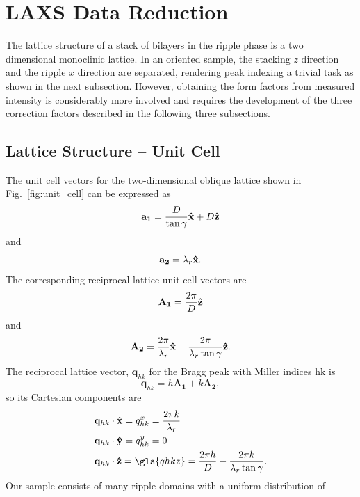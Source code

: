 \newpage
\section{LAXS Data Reduction}\label{sec:LAXS_data_reduction}
The lattice structure of a stack of bilayers in the ripple  phase is a two 
dimensional monoclinic lattice. 
In an oriented sample, the stacking $z$ direction and the ripple
$x$ direction are separated, rendering peak indexing a trivial task as 
shown in the next subsection.
However, obtaining the form factors from measured intensity is considerably
more involved and requires the development of the three correction factors 
described in the following three subsections.

\subsection{Lattice Structure -- Unit Cell}\label{sec:lattice_structure}
The unit cell vectors for the two-dimensional oblique lattice shown in Fig.~\ref{fig:unit_cell}
can be expressed as 
\begin{equation}
  \mathbf{a_1} = \frac{D}{\tan\gamma}\mathbf{\hat{x}} + D\mathbf{\hat{z}}
\end{equation}
and
\begin{equation}
  \mathbf{a_2} = \lambda_r\mathbf{\hat{x}}.
\end{equation}
The corresponding reciprocal lattice unit cell vectors are
\begin{equation}
  \mathbf{A_1} = \frac{2\pi}{D}\mathbf{\hat{z}}
\end{equation}
and
\begin{equation}
  \mathbf{A_2} = \frac{2\pi}{\lambda_r}\mathbf{\hat{x}} - \frac{2\pi}{\lambda_r\tan\gamma}\mathbf{\hat{z}}.
\end{equation}
The reciprocal lattice vector, $\mathbf{q}_{hk}$ for the Bragg peak with 
Miller indices \gls{hk} is 
\begin{equation}
  \mathbf{q}_{hk}=h\mathbf{A_1}+k\mathbf{A_2},
\end{equation}
so its Cartesian components are
\begin{align}
  & \mathbf{q}_{hk}\cdot\xhat = q_{hk}^x = \frac{2\pi k}{\lambda_r}\\
  & \mathbf{q}_{hk}\cdot\yhat = q_{hk}^y = 0 \\
  & \mathbf{q}_{hk}\cdot\zhat = \gls{qhkz} = \frac{2\pi h}{D} - \frac{2\pi k}{\lambda_r\tan\gamma}.
\end{align}
Our sample consists of many ripple domains with a uniform distribution of 
